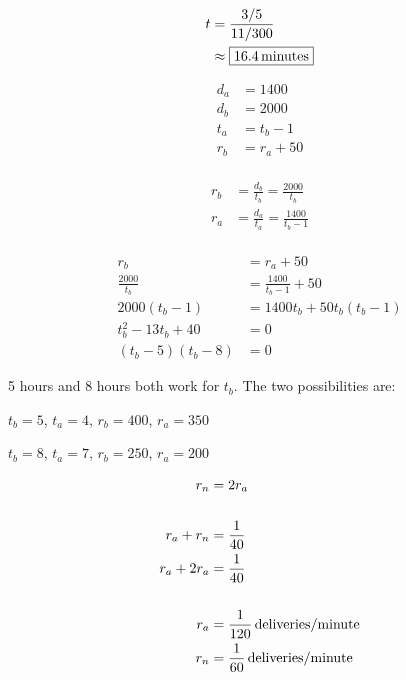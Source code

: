\documentclass[letterpaper, landscape]{exam}
\begin{document}
\begin{description}
        \begin{align*}
          t & = \frac{3/5}{11/300} \\
            & \approx \boxed{ \unit[16.4]{minutes} } \\
        \end{align*}

      \item[51]
        \begin{align*}
          d_a & = 1400 \\
          d_b & = 2000 \\
          t_a & = t_b - 1 \\
          r_b & = r_a + 50 \\
        \end{align*}

        \begin{align*}
          r_b & = \frac{d_b}{t_b} = \frac{2000}{t_b} \\
          r_a & = \frac{d_a}{t_a} = \frac{1400}{t_b - 1} \\
        \end{align*}

        \begin{align*}
          r_b                & = r_a + 50 \\
          \frac{2000}{t_b}   & = \frac{1400}{t_b - 1} + 50 \\
          2000(t_b-1)        & = 1400t_b + 50t_b(t_b-1) \\
          t_b^2 - 13t_b + 40 & = 0 \\
          (t_b-5)(t_b-8)     & = 0
        \end{align*}

        5 hours and 8 hours both work for $t_b$.  The two possibilities are:
        \begin{itemize*}
          \item $t_b = 5$, $t_a = 4$, $r_b = 400$, $r_a = 350$
          \item $t_b = 8$, $t_a = 7$, $r_b = 250$, $r_a = 200$
        \end{itemize*}

      \item[53]
        \begin{align*}
          r_n &= 2 r_a \\
          \\
          r_a + r_n &= \frac{1}{40} \\
          r_a + 2r_a &= \frac{1}{40} \\
          \\
          r_a &= \unit[\frac{1}{120}]{deliveries/minute} \\
          r_n &= \unit[\frac{1}{60}]{deliveries/minute} \\
        \end{align*}


\end{description}
\end{document}

